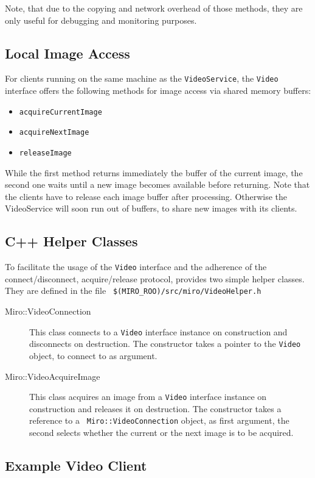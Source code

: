 Note, that due to the copying and network overhead of those methods,
they are only useful for debugging and monitoring purposes.

\subsection{Local Image Access}

For clients running on the same machine as the {\tt VideoService}, the
{\tt Video} interface offers the following methods for image access
via shared memory buffers:
\begin{itemize}
\item {\tt acquireCurrentImage}
\item {\tt acquireNextImage}
\item {\tt releaseImage}
\end{itemize}
While the first method returns immediately the buffer of the current
image, the second one waits until a new image becomes available before
returning. Note that the clients have to release each image buffer
after processing. Otherwise the VideoService will soon run out of
buffers, to share new images with its clients.

\subsection{C++ Helper Classes}

To facilitate the usage of the {\tt Video} interface and the adherence
of the connect/disconnect, acquire/release protocol, \miro provides
two simple helper classes. They are defined in the file {\tt
  \$(MIRO\_ROO)/src/miro/VideoHelper.h}

\begin{description}
\item[Miro::VideoConnection] This class connects to a {\tt Video}
  interface instance on construction and disconnects on destruction.
  The constructor takes a pointer to the {\tt Video} object, to
  connect to as argument.
\item[Miro::VideoAcquireImage] This class acquires an image from a
  {\tt Video} interface instance on construction and releases it on
  destruction. The constructor takes a reference to a {\tt
    Miro::VideoConnection} object, as first argument, the second
  selects whether the current or the next image is to be acquired.
\end{description}

\subsection{Example Video Client}

